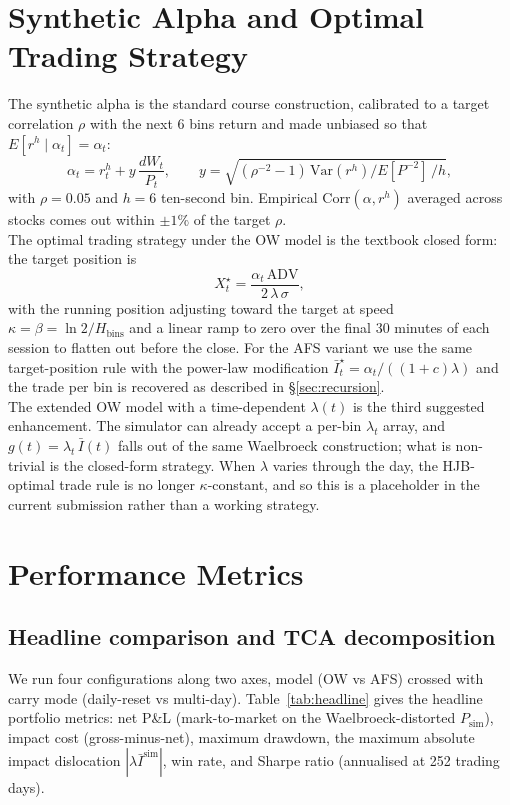\documentclass[11pt,a4paper]{article}
\begin{document}
\section{Synthetic Alpha and Optimal Trading Strategy}\label{sec:alpha}

The synthetic alpha is the standard course construction, calibrated
to a target correlation $\rho$ with the next 6 bins return and made
unbiased so that $E[r^h \mid \alpha_t] = \alpha_t$:
\[
  \alpha_t = r^h_t + y\,\frac{dW_t}{P_t},
  \qquad
  y = \sqrt{(\rho^{-2}-1)\,\mathrm{Var}(r^h)/E[P^{-2}]\,/h},
\]
with $\rho = 0.05$ and $h = 6$ ten-second bin.  Empirical
$\mathrm{Corr}(\alpha,r^h)$ averaged across stocks comes out within
$\pm 1\%$ of the target $\rho$.
\\
The optimal trading strategy under the OW model is the textbook
closed form: the target position is
\[
  X^\star_t = \frac{\alpha_t\,\mathrm{ADV}}{2\,\lambda\,\sigma},
\]
with the running position adjusting toward the target at speed $\kappa = \beta = \ln 2/H_{\text{bins}}$ and a linear ramp to zero over the final 30 minutes of each session to flatten out before the close.  For the AFS variant we use the same target-position rule with the power-law modification $\bar I^\star_t = \alpha_t/((1+c)\lambda)$ and the trade per bin is recovered as described in \S\ref{sec:recursion}.
\\
The extended OW model with a time-dependent $\lambda(t)$ is the third
suggested enhancement.  The simulator can already accept a per-bin
$\lambda_t$ array, and $g(t) = \lambda_t\,\bar I(t)$ falls out of the
same Waelbroeck construction; what is non-trivial is the closed-form
strategy.  When $\lambda$ varies through the day, the HJB-optimal
trade rule is no longer $\kappa$-constant, and so this is a placeholder
in the current submission rather than a working strategy.

\section{Performance Metrics}\label{sec:perf}

\subsection{Headline comparison and TCA decomposition}

We run four configurations along two axes, model (OW vs AFS) crossed
with carry mode (daily-reset vs multi-day).  Table~\ref{tab:headline}
gives the headline portfolio metrics: net P\&L (mark-to-market on the
Waelbroeck-distorted $P_{\text{sim}}$), impact cost (gross-minus-net),
maximum drawdown, the maximum absolute impact dislocation
$|\lambda\bar I^{\text{sim}}|$, win rate, and Sharpe ratio (annualised
at 252 trading days).
\end{document}
